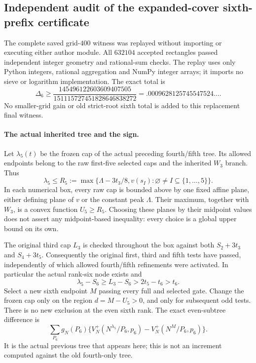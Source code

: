 \subsection{Independent audit of the expanded-cover sixth-prefix certificate}
\label{sec:sixth-expanded-independent-audit}

The complete saved grid-$400$ witness was replayed without importing or
executing either author module. All $632104$ accepted rectangles passed
independent integer geometry and rational-sum checks. The replay uses
only Python integers, rational aggregation and NumPy integer arrays;
it imports no sieve or logarithm implementation. The exact total is
\begin{equation}\label{eq:sixth-expanded-independent-gain}
 \Delta_6\ge
 \frac{145496122603609407505}{151115727451828646838272}
 =.0009628125745547524\ldots.
\end{equation}
No smaller-grid gain or old strict-root sixth total is added to this replacement final witness.

\paragraph{The actual inherited tree and the sign.}
Let $\lambda_5(t)$ be the frozen cap of the actual preceding
fourth/fifth tree. Its allowed endpoints belong to the raw first-five
selected caps and the inherited $W_3$ branch. Thus
\[
 \lambda_5\le R_5:=\max\{\Lambda-3t_3/8,
               v(s_I):\varnothing\ne I\subseteq\{1,\ldots,5\}\}.
\]
In each numerical box, every raw cap is bounded above by one fixed
affine plane, either defining plane of $v$ or the constant peak
$\Lambda$. Their maximum, together with $W_3$, is a convex function
$U_5\ge R_5$. Choosing these planes by their midpoint values does not
assert any midpoint-based inequality: every choice is a global upper
bound on its own.

The original third cap $L_3$ is checked throughout the box against
both $S_2+3t_3$ and $S_4+3t_5$. Consequently the original first,
third and fifth tests have passed, independently of which allowed
fourth/fifth refinements were activated. In particular the actual
rank-six node exists and
\[
 \lambda_5-S_6\ge L_3-S_6>2t_5-t_6>t_6.
\]
Select a new sixth endpoint $M$ passing every full and selected gate.
Change the frozen cap only on the region $d=M-U_5>0$, and only for
subsequent odd tests. There is no new exclusion at the even sixth
rank. The exact even-subtree difference is
\[
 \sum_{P_6}g_N(P_6)
 \{V_N^+(N^{\lambda_5}/P_6,p_6)
       -V_N^+(N^M/P_6,p_6)\}.
\]
It is the actual previous tree that appears here; this is not an
increment computed against the old fourth-only tree.

